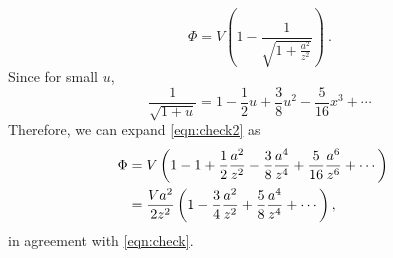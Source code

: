 \documentclass[12pt]{article}
\begin{document}
\begin{equation} \label{eqn:check2}
\Phi = V\left(1 - \frac{1}{\sqrt{1 + \frac{a^2}{z^2}}}\right)~.
\end{equation}
Since for small $u$,
\begin{equation}
    \frac{1}{\sqrt{1+u}} = 1 - \frac{1}{2}u + \frac{3}{8}u^2 - \frac{5}{16} x^3 + \cdots
\end{equation}
Therefore, we can expand \eqref{eqn:check2} as
\begin{align}
    \Phi &= V\left(1 - 1 + \frac12 \frac{a^2}{z^2}  - \frac38 \frac{a^4}{z^4}  + \frac{5}{16} \frac{a^6}{z^6} +\cdots\right) \cr
    &=\frac{Va^2}{2z^2} \left( 1- \frac34 \frac{a^2}{z^2} + \frac{5}{8} \frac{a^4}{z^4} + \cdots\right),
\end{align}
in agreement with \eqref{eqn:check}.
\end{document}
